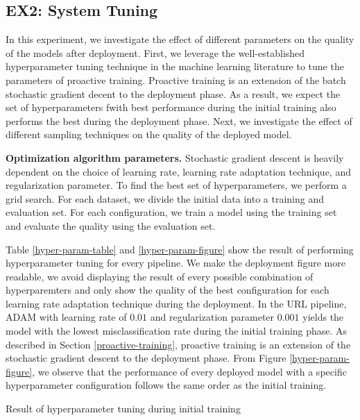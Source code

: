\subsection{EX2: System Tuning}
In this experiment, we investigate the effect of different parameters on the quality of the models after deployment.
First, we leverage the well-established hyperparameter tuning technique in the machine learning literature to tune the parameters of proactive training.
Proactive training is an extension of the batch stochastic gradient decent to the deployment phase.
As a result, we expect the set of hyperparameters fwith best performance during the initial training also performs the best during the deployment phase.
Next, we investigate the effect of different sampling techniques on the quality of the deployed model.

\textbf{Optimization algorithm parameters. }
Stochastic gradient descent is heavily dependent on the choice of learning rate, learning rate adaptation technique, and regularization parameter.
To find the best set of hyperparameters, we perform a grid search.
For each dataset, we divide the initial data into a training and evaluation set.
For each configuration, we train a model using the training set and evaluate the quality using the evaluation set.

Table \ref{hyper-param-table} and \ref{hyper-param-figure} show the result of performing hyperparameter tuning for every pipeline.
We make the deployment figure more readable, we avoid displaying the result of every possible combination of hyperparemters and only show the quality of the best configuration for each learning rate adaptation technique during the deployment.
In the URL pipeline, ADAM with learning rate of $0.01$ and regularization parameter $0.001$ yields the model with the lowest misclassification rate during the initial training phase.
As described in Section \ref{proactive-training}, proactive training is an extension of the stochastic gradient descent to the deployment phase.
From Figure \ref{hyper-param-figure}, we observe that the performance of every deployed model with a specific hyperparameter configuration follows the same order as the initial training.

\begin{table*}[!h]
\centering
\begin{adjustbox}{max width=\textwidth}

\end{adjustbox}
\caption{Result of hyperparameter tuning during initial training}
\label{hyper-param-table}
\end{table*}

